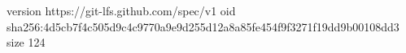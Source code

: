 version https://git-lfs.github.com/spec/v1
oid sha256:4d5cb7f4c505d9c4c9770a9e9d255d12a8a85fe454f9f3271f19dd9b00108dd3
size 124
